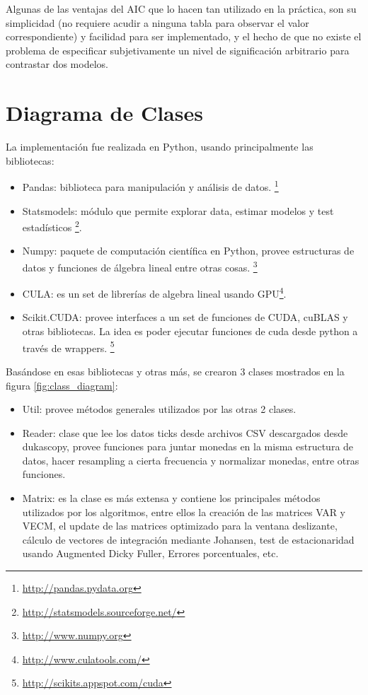 Algunas de las ventajas del AIC que lo hacen tan utilizado en la práctica, son
su simplicidad (no requiere acudir a ninguna tabla para observar el valor
correspondiente) y facilidad para ser implementado, y el hecho de que no existe
el problema de especificar subjetivamente un nivel de significación arbitrario
para contrastar dos modelos.

\section{Diagrama de Clases}
La implementación fue realizada en Python, usando principalmente las bibliotecas:
\begin{itemize}
 \item Pandas: biblioteca para manipulación y análisis de datos.
\footnote{\url{http://pandas.pydata.org}}
 \item Statsmodels: módulo que permite explorar data, estimar modelos y test
estadísticos \footnote{\url{http://statsmodels.sourceforge.net/}}.
 \item Numpy: paquete de computación científica en Python, provee estructuras
de datos y funciones de álgebra lineal entre otras cosas.
\footnote{\url{http://www.numpy.org}}
 \item CULA: es un set de librerías de algebra lineal usando
GPU\footnote{\url{http://www.culatools.com/}}.
 \item Scikit.CUDA: provee interfaces a un set de funciones de CUDA, cuBLAS y
otras bibliotecas. La idea es poder ejecutar funciones de cuda desde python a
través de wrappers. \footnote{\url{http://scikits.appspot.com/cuda}}
\end{itemize}

Basándose en esas bibliotecas y otras más, se crearon 3 clases mostrados en la
figura \ref{fig:class_diagram}:
\begin{itemize}
 \item Util: provee métodos generales utilizados por las otras 2 clases.
 \item Reader: clase que lee los datos ticks desde archivos CSV descargados
desde dukascopy, provee funciones para juntar monedas en la misma estructura de
datos, hacer resampling a cierta frecuencia y normalizar monedas, entre otras
funciones.
 \item Matrix: es la clase es más extensa y contiene los principales métodos
utilizados por los algoritmos, entre ellos la creación de las matrices VAR y
VECM, el update de las matrices optimizado para la ventana deslizante, cálculo
de vectores de integración mediante Johansen, test de estacionaridad usando
Augmented Dicky Fuller, Errores porcentuales, etc.
\end{itemize}

